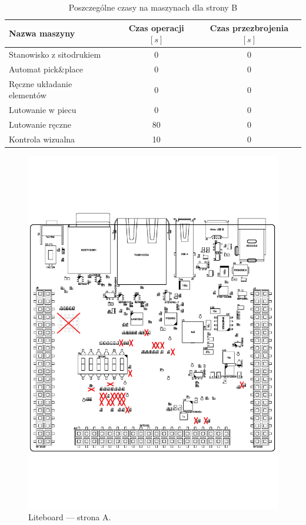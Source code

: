 \begin{table}[H]
	\centering
	\caption{Poszczególne czasy na maszynach dla strony B}
	\begin{tabular}{lcc}
		\toprule
		Nazwa maszyny                 & Czas operacji $[s]$ & Czas przezbrojenia $[s]$ \\
		\midrule
		Stanowisko z sitodrukiem      & 0                   & 0                        \\
		Automat pick\&place           & 0                   & 0                        \\
		Ręczne układanie elementów & 0                   & 0                        \\
		Lutowanie w piecu             & 0                   & 0                        \\
		Lutowanie ręczne             & 80                  & 0                        \\
		Kontrola wizualna             & 10                  & 0                        \\
		\bottomrule
	\end{tabular}
	\label{liteboard:b}
\end{table}

\begin{figure}[H]
	\centering
	\includegraphics[width=0.8\linewidth,clip, trim=0cm 4cm 0cm 4cm]{./chapters/chapter5/liteboard_A.PDF}
	\caption{Liteboard --- strona A.}\label{liteboard:StronaA}
\end{figure}


